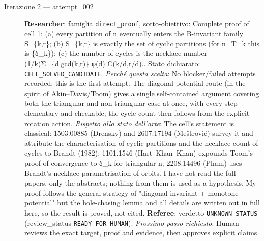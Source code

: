 \documentclass[11pt,a4paper]{article}
\begin{document}
\begin{description}
\item[Iterazione 2 — attempt\_002]
\textbf{Researcher}: famiglia \texttt{direct\_proof}, sotto-obiettivo: Complete proof of cell 1: (a) every partition of n eventually enters the B-invariant family S\_\{k,r\}; (b) S\_\{k,r\} is exactly the set of cyclic partitions (for n=T\_k this is \{δ\_k\}); (c) the number of cycles is the necklace number (1/k)Σ\_\{d|gcd(k,r)\} φ(d) C(k/d,r/d).. Stato dichiarato: \texttt{CELL\_SOLVED\_CANDIDATE}.
\emph{Perché questa scelta}: No blocker/failed attempts recorded; this is the first attempt. The diagonal-potential route (in the spirit of Akin–Davis/Toom) gives a single self-contained argument covering both the triangular and non-triangular case at once, with every step elementary and checkable; the cycle count then follows from the explicit rotation action.
\emph{Rispetto allo stato dell'arte}: The cell's statement is classical: 1503.00885 (Drensky) and 2607.17194 (Meštrović) survey it and attribute the characterisation of cyclic partitions and the necklace count of cycles to Brandt (1982); 1101.1546 (Hart–Khan–Khan) expounds Toom's proof of convergence to δ\_k for triangular n; 2208.14496 (Pham) uses Brandt's necklace parametrisation of orbits. I have not read the full papers, only the abstracts; nothing from them is used as a hypothesis. My proof follows the general strategy of "diagonal invariant + monotone potential" but the hole-chasing lemma and all details are written out in full here, so the result is proved, not cited.
\textbf{Referee}: verdetto \texttt{UNKNOWN\_STATUS} (review\_status \texttt{READY\_FOR\_HUMAN}).
\emph{Prossimo passo richiesto}: Human reviews the exact target, proof and evidence, then approves explicit claims
\end{description}
\end{document}
